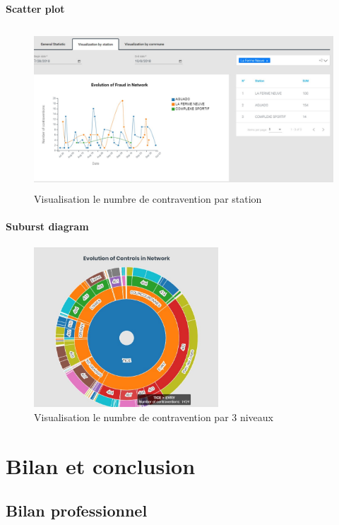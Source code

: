 \documentclass[french, a4paper, 12pt]{report}
\begin{document}
\subsubsection{Scatter plot}
\begin{figure}[!htp]
    \centering
    \includegraphics[height=6cm]{images/datategy-scatter-plot.jpg}
    \scriptsize{}
    \caption{Visualisation le numbre de contravention par station}
    \label{fig:3.2}
\end{figure}


\subsubsection{Suburst diagram}
\begin{figure}[!htp]
    \centering
    \includegraphics[height=6cm]{images/datategy-sunburst.jpg}
    \scriptsize{}
    \caption{Visualisation le numbre de contravention par 3 niveaux}
    \label{fig:3.3}
\end{figure}

\chapter{ Bilan et conclusion}
\section{Bilan professionnel}
\end{document}
